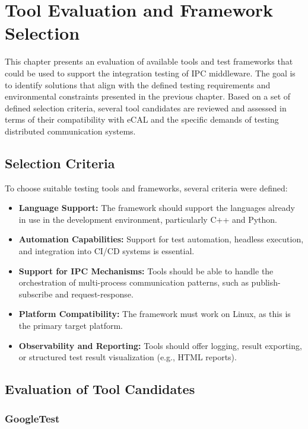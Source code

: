 \clearpage
\section{Tool Evaluation and Framework Selection}

This chapter presents an evaluation of available tools and test frameworks that could be used to support the integration testing of IPC middleware. The goal is to identify solutions that align with the defined testing requirements and environmental constraints presented in the previous chapter. Based on a set of defined selection criteria, several tool candidates are reviewed and assessed in terms of their compatibility with eCAL and the specific demands of testing distributed communication systems.

\subsection{Selection Criteria}

To choose suitable testing tools and frameworks, several criteria were defined:

\begin{itemize}
	\item \textbf{Language Support:} The framework should support the languages already in use in the development environment, particularly C++ and Python.
	\item \textbf{Automation Capabilities:} Support for test automation, headless execution, and integration into CI/CD systems is essential.
	\item \textbf{Support for IPC Mechanisms:} Tools should be able to handle the orchestration of multi-process communication patterns, such as publish-subscribe and request-response.
	\item \textbf{Platform Compatibility:} The framework must work on Linux, as this is the primary target platform.
	\item \textbf{Observability and Reporting:} Tools should offer logging, result exporting, or structured test result visualization (e.g., HTML reports).
\end{itemize}

\newpage
\subsection{Evaluation of Tool Candidates}

\subsubsection*{GoogleTest}

